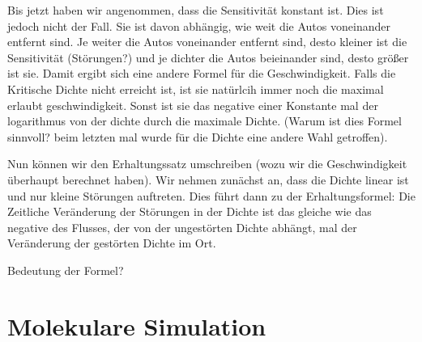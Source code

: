 \documentclass[]{article}
\begin{document}
Bis jetzt haben wir angenommen, dass die Sensitivität konstant ist. Dies ist jedoch nicht der Fall. Sie ist davon abhängig, wie weit die Autos voneinander entfernt sind. Je weiter die Autos voneinander entfernt sind, desto kleiner ist die Sensitivität (Störungen?) und je dichter die Autos beieinander sind, desto größer ist sie. Damit ergibt sich eine andere Formel für die Geschwindigkeit. Falls die Kritische Dichte nicht erreicht ist, ist sie natürlcih immer noch die maximal erlaubt geschwindigkeit. Sonst ist sie das negative einer Konstante mal der logarithmus von der dichte durch die maximale Dichte.  (Warum ist dies Formel sinnvoll? beim letzten mal wurde für die Dichte eine andere Wahl getroffen). 

Nun können wir den Erhaltungssatz umschreiben (wozu wir die Geschwindigkeit überhaupt berechnet haben). Wir nehmen zunächst an, dass die Dichte linear ist und nur kleine Störungen auftreten. Dies führt dann zu der Erhaltungsformel: Die Zeitliche Veränderung der Störungen in der Dichte ist das gleiche wie das negative des Flusses, der von der ungestörten Dichte abhängt, mal der Veränderung der gestörten Dichte im Ort. 

Bedeutung der Formel? 



\section{Molekulare Simulation}

  
\end{document}
